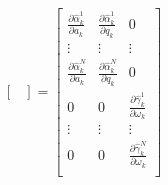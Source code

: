 \documentclass[11pt]{article}
\newcommand{\pd}[2]{\frac{\partial #1}{\partial #2}} %
\begin{document}
\begin{align*}
\begin{bmatrix}
    \end{bmatrix} = \begin{bmatrix}
        \pd{\hat{\alpha}^1_k}{a_k} & \pd{\hat{\alpha}^1_k}{q_k} & 0 \\
        \vdots & \vdots & \vdots \\
        \pd{\hat{\alpha}^N_k}{a_k} & \pd{\hat{\alpha}^N_k}{q_k} & 0 \\
        0 & 0 & \pd{\hat{\gamma}^1_k}{\omega_k} \\
        \vdots & \vdots & \vdots \\
        0 & 0 & \pd{\hat{\gamma}^N_k}{\omega_k} \\
    \end{bmatrix} \\
\end{align*}
\end{document}
